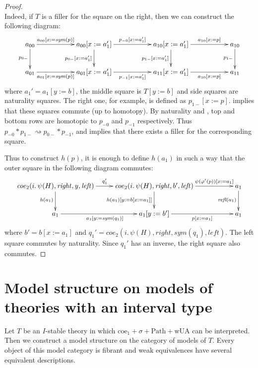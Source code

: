 \documentclass{mscs}
\newcommand{\repl}{:=}
\newcommand{\wUA}{\mathrm{wUA}}
\newcommand{\coeT}{\mathrm{coe}}
\newcommand{\PathT}{\mathrm{Path}}
\newcommand{\refl}{\mathit{refl}}
\newcommand{\leftI}{\mathit{left}}
\newcommand{\rightI}{\mathit{right}}
\newcommand{\coe}{\mathit{coe}}
\newcommand{\idtype}{\rightsquigarrow}
\newcommand{\sym}{\mathit{sym}}
\numberwithin{figure}{section}
\begin{document}
\begin{proof}
\[{            } \]
Indeed, if $T$ is a filler for the square on the right, then we can construct the following diagram:
\[ \xymatrix{ a_{00} \ar[rr]^-{a_{00}[x \repl \sym(p)]} \ar[d]_{p_{0-}} & & a_{00}[x \repl a_1'] \ar[rr]^{p_{-0}[x \repl a_1']} \ar[d]_{p_{0-}[x \repl a_1']} & & a_{10}[x \repl a_1'] \ar[d]_{p_{1-}[x \repl a_1']} \ar[rr]^-{a_{10}[x \repl p]} & & a_{10} \ar[d]_{p_{1-}} \\
              a_{01} \ar[rr]_-{a_{01}[x \repl \sym(p)]}                 & & a_{01}[x \repl a_1'] \ar[rr]_{p_{-1}[x \repl a_1']}                               & & a_{11}[x \repl a_1']                               \ar[rr]_-{a_{10}[x \repl p]} & & a_{11}
            } \]
where $a_1' = a_1[y \repl b]$, the middle square is $T[y \repl b]$ and side squares are naturality squares.
The right one, for example, is defined as $p_{1-}[x \repl p]$.
 implies that these squares commute (up to homotopy).
By naturality and , top and bottom rows are homotopic to $p_{-0}$ and $p_{-1}$ respectively.
Thus $p_{-0} * p_{1-} \idtype p_{0-} * p_{-1}$, and  implies that there exists a filler for the corresponding square.

Thus to construct $h(p)$, it is enough to define $h(a_1)$ in such a way that the outer square in the following diagram commutes:
\[ \xymatrix{ \coe_2(i.\,\psi(H), \rightI, y, \leftI) \ar[r]^{q_1'} \ar[d]_{h(a_1)} & \coe_2(i.\,\psi(H), \rightI, b', \leftI) \ar[rr]^-{\psi(\varphi'(p))[x \repl a_1]} \ar[d]_{h(a_1)[y \repl b[x \repl a_1]]} & & a_1 \ar[d]_{\refl(a_1)} \\
              a_1 \ar[r]_{a_1[y \repl \sym(q_1)]} & a_1[y \repl b'] \ar[rr]_-{p[x \repl a_1]}                                                                                                                     & & a_1
            } \]
where $b' = b[x \repl a_1]$ and $q_1' = \coe_2(i.\,\psi(H), \rightI, \sym(q_1), \leftI)$.
The left square commutes by naturality.
Since $q_1'$ has an inverse, the right square also commutes.
\end{proof}

\section{Model structure on models of theories with an interval type}
\label{sec:model-structure}

Let $T$ be an $I$-stable theory in which $\coeT_1 + \sigma + \PathT + \wUA$ can be interpreted.
Then we construct a model structure on the category of models of $T$.
Every object of this model category is fibrant and weak equivalences have several equivalent descriptions.
\end{document}
